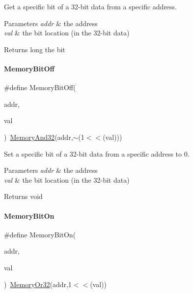 Get a specific bit of a 32-\/bit data from a specific address. 


\begin{DoxyParams}{Parameters}
{\em addr} & the address \\
\hline
{\em val} & the bit location (in the 32-\/bit data) \\
\hline
\end{DoxyParams}
\begin{DoxyReturn}{Returns}
long the bit 
\end{DoxyReturn}
\mbox{\label{a00020_a04c34919a950117ae7da2dc5a235622b}} 
\paragraph{\texorpdfstring{Memory\+Bit\+Off}{MemoryBitOff}}
{\footnotesize\ttfamily \#define Memory\+Bit\+Off(\begin{DoxyParamCaption}\item[{}]{addr,  }\item[{}]{val }\end{DoxyParamCaption})~\mbox{\hyperlink{a00020_ad87cedffcaadc51db22594fce55173d4}{Memory\+And32}}(addr,$\sim$(1$<$$<$(val)))}



Set a specific bit of a 32-\/bit data from a specific address to 0. 


\begin{DoxyParams}{Parameters}
{\em addr} & the address \\
\hline
{\em val} & the bit location (in the 32-\/bit data) \\
\hline
\end{DoxyParams}
\begin{DoxyReturn}{Returns}
void 
\end{DoxyReturn}
\mbox{\label{a00020_a99a602346038b54068758ef00c42d1b6}} 
\paragraph{\texorpdfstring{Memory\+Bit\+On}{MemoryBitOn}}
{\footnotesize\ttfamily \#define Memory\+Bit\+On(\begin{DoxyParamCaption}\item[{}]{addr,  }\item[{}]{val }\end{DoxyParamCaption})~\mbox{\hyperlink{a00020_a27874a97deab7cecdde5ddecf466e31e}{Memory\+Or32}}(addr,1$<$$<$(val))}



